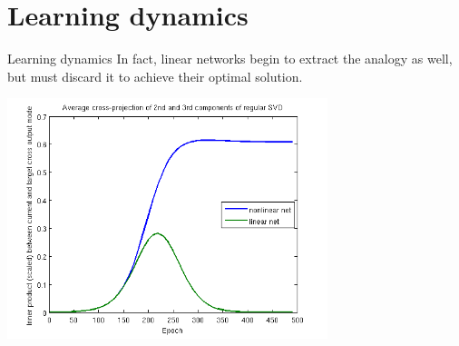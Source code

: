\documentclass{beamer}
\begin{document}
\section{Learning dynamics}
\begin{frame}{Learning dynamics}
In fact, linear networks begin to extract the analogy as well, but must discard it to achieve their optimal solution.
\begin{center}
\includegraphics[width=0.7\textwidth]{../writing/cogsci_2017/figures/SVD_cross_projection_learning.png}
\end{center}
\end{frame}
\end{document}
